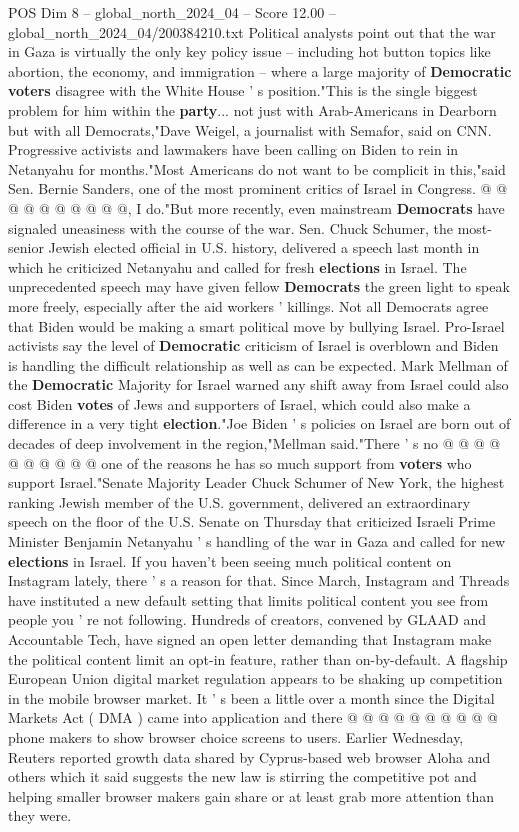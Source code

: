 \begin{textsample}{POS Dim 8 – global\_north\_2024\_04 – Score 12.00 – global\_north\_2024\_04/200384210.txt}
Political analysts point out that the war in Gaza is virtually the only key policy issue -- including hot button topics like abortion, the economy, and immigration -- where a large majority of \textbf{Democratic} \textbf{voters} disagree with the White House ' s position."This is the single biggest problem for him within the \textbf{party}... not just with Arab-Americans in Dearborn but with all Democrats,"Dave Weigel, a journalist with Semafor, said on CNN.
Progressive activists and lawmakers have been calling on Biden to rein in Netanyahu for months."Most Americans do not want to be complicit in this,"said Sen.
Bernie Sanders, one of the most prominent critics of Israel in Congress. @ @ @ @ @ @ @ @ @ @, I do."But more recently, even mainstream \textbf{Democrats} have signaled uneasiness with the course of the war.
Sen.
Chuck Schumer, the most-senior Jewish elected official in U.S. history, delivered a speech last month in which he criticized Netanyahu and called for fresh \textbf{elections} in Israel.
The unprecedented speech may have given fellow \textbf{Democrats} the green light to speak more freely, especially after the aid workers ' killings.
Not all Democrats agree that Biden would be making a smart political move by bullying Israel.
Pro-Israel activists say the level of \textbf{Democratic} criticism of Israel is overblown and Biden is handling the difficult relationship as well as can be expected.
Mark Mellman of the \textbf{Democratic} Majority for Israel warned any shift away from Israel could also cost Biden \textbf{votes} of Jews and supporters of Israel, which could also make a difference in a very tight \textbf{election}."Joe Biden ' s policies on Israel are born out of decades of deep involvement in the region,"Mellman said."There ' s no @ @ @ @ @ @ @ @ @ @ one of the reasons he has so much support from \textbf{voters} who support Israel."Senate Majority Leader Chuck Schumer of New York, the highest ranking Jewish member of the U.S. government, delivered an extraordinary speech on the floor of the U.S.
Senate on Thursday that criticized Israeli Prime Minister Benjamin Netanyahu ' s handling of the war in Gaza and called for new \textbf{elections} in Israel.
If you haven't been seeing much political content on Instagram lately, there ' s a reason for that.
Since March, Instagram and Threads have instituted a new default setting that limits political content you see from people you ' re not following.
Hundreds of creators, convened by GLAAD and Accountable Tech, have signed an open letter demanding that Instagram make the political content limit an opt-in feature, rather than on-by-default.
A flagship European Union digital market regulation appears to be shaking up competition in the mobile browser market.
It ' s been a little over a month since the Digital Markets Act ( DMA ) came into application and there @ @ @ @ @ @ @ @ @ @ phone makers to show browser choice screens to users.
Earlier Wednesday, Reuters reported growth data shared by Cyprus-based web browser Aloha and others which it said suggests the new law is stirring the competitive pot and helping smaller browser makers gain share or at least grab more attention than they were.


\end{textsample}
